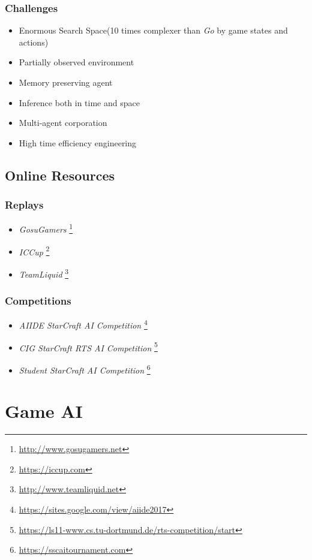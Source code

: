 \documentclass[sigconf]{acmart}
\begin{document}
\subsubsection{Challenges}
\begin{itemize}
\item Enormous Search Space(10 times complexer than \emph{Go} by game states and actions)
\item Partially observed environment
\item Memory preserving agent
\item Inference both in time and space
\item Multi-agent corporation
\item High time efficiency engineering
\end{itemize}

\subsection{Online Resources}
\subsubsection{Replays}
\begin{itemize}
\item \emph{GosuGamers}
	  \footnote{\url{http://www.gosugamers.net}}
\item \emph{ICCup}
	  \footnote{\url{https://iccup.com}}
\item \emph{TeamLiquid}
	  \footnote{\url{http://www.teamliquid.net}}
\end{itemize}
\subsubsection{Competitions}
\begin{itemize}
\item \emph{AIIDE StarCraft AI Competition}
	  \footnote{\url{https://sites.google.com/view/aiide2017}}
\item \emph{CIG StarCraft RTS AI Competition}
	  \footnote{\url{https://ls11-www.cs.tu-dortmund.de/rts-competition/start}}
\item \emph{Student StarCraft AI Competition}
	  \footnote{\url{https://sscaitournament.com}}
\end{itemize}

\section{Game AI}
\end{document}
